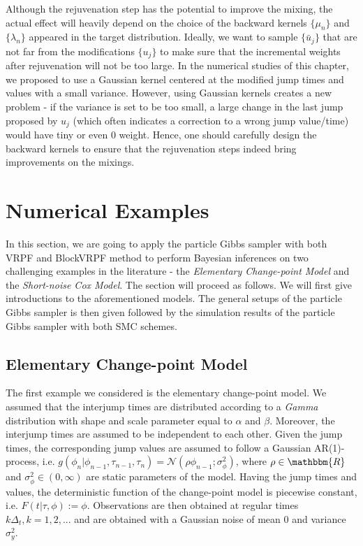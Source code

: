 \documentclass[12pt,a4paper]{article}
\begin{document}
Although the rejuvenation step has the potential to improve the mixing, the actual effect will heavily depend on the choice of the backward kernels \(\{\mu_n\}\) and \(\{\lambda_n\}\) appeared in the target distribution. Ideally, we want to sample \(\{\bar{u}_j\}\) that are not far from the modifications \(\{u_j\}\) to make sure that the incremental weights after rejuvenation will not be too large. In the numerical studies of this chapter, we proposed to use a Gaussian kernel centered at the modified jump times and values with a small variance. However, using Gaussian kernels creates a new problem - if the variance is set to be too small, a large change in the last jump proposed by \(u_j\) (which often indicates a correction to a wrong jump value/time) would have tiny or even 0 weight. Hence, one should carefully design the backward kernels to ensure that the rejuvenation steps indeed bring improvements on the mixings. 
\section{Numerical Examples}
In this section, we are going to apply the particle Gibbs sampler with both VRPF and BlockVRPF method to perform Bayesian inferences on two challenging examples in the literature - the \textit{Elementary Change-point Model} and the \textit{Short-noise Cox Model}. The section will proceed as follows. We will first give introductions to the aforementioned models. The general setups of the particle Gibbs sampler is then given followed by the simulation results of the particle Gibbs sampler with both SMC schemes. 
\subsection{Elementary Change-point Model}
The first example we considered is the elementary change-point model. We assumed that the interjump times are distributed according to a \textit{Gamma} distribution with shape and scale parameter equal to \(\alpha\) and \(\beta\). Moreover, the interjump times are assumed to be independent to each other. Given the jump times, the corresponding jump values are assumed to follow a Gaussian AR(1)-process, i.e. \(g(\phi_n|\phi_{n-1},\tau_{n-1},\tau_n) = \mathcal{N}(\rho\phi_{n-1};\sigma_{\phi}^2)\), where \(\rho \in \mathbbm{R}\) and \(\sigma_{\phi}^2 \in (0,\infty)\) are static parameters of the model. Having the jump times and values, the deterministic function of the change-point model is piecewise constant, i.e. \(F(t|\tau,\phi):= \phi\). Observations are then obtained at regular times \(k\Delta_t, k= 1,2,...\) and are obtained with a Gaussian noise of mean \(0\) and variance \(\sigma_y^2\). 
\end{document}

